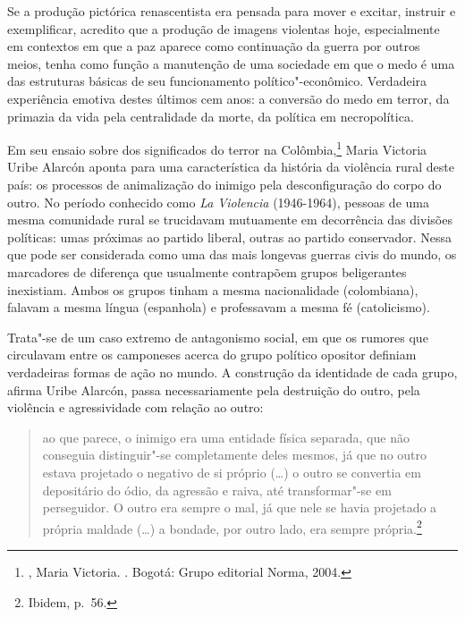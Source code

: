 Se a produção pictórica renascentista era pensada para mover e excitar,
instruir e exemplificar, acredito que a produção de imagens violentas
hoje, especialmente em contextos em que a paz aparece como continuação
da guerra por outros meios, tenha como função a
manutenção de uma sociedade em que o medo é uma das estruturas básicas
de seu funcionamento político"-econômico. Verdadeira experiência emotiva
destes últimos cem anos: a conversão do medo em terror, da primazia da
vida pela centralidade da morte, da política em necropolítica.

\asterisc

Em seu ensaio sobre dos significados do terror na Colômbia,\footnote{, Maria Victoria. {}. Bogotá: Grupo
  editorial Norma, 2004.} Maria Victoria Uribe Alarcón aponta
para uma característica da história da violência rural deste país: os
processos de animalização do inimigo pela desconfiguração do corpo do outro. No
período conhecido como \emph{La Violencia} (1946-1964), pessoas de uma
mesma comunidade rural se trucidavam mutuamente em decorrência das
divisões políticas: umas próximas ao partido liberal, outras ao partido
conservador. Nessa que pode ser considerada como uma das mais longevas
guerras civis do mundo, os marcadores de diferença que usualmente
contrapõem grupos beligerantes inexistiam. Ambos os grupos tinham a
mesma nacionalidade (colombiana), falavam a mesma língua (espanhola) e
professavam a mesma fé (catolicismo).

Trata"-se de um caso extremo de antagonismo social, em que os rumores que
circulavam entre os camponeses acerca do grupo político opositor definiam verdadeiras formas de ação no mundo. A construção da identidade
de cada grupo, afirma Uribe Alarcón, passa necessariamente pela
destruição do outro, pela violência e agressividade com relação ao
outro:

\begin{quote}
ao que parece, o inimigo era uma entidade física separada, que não
conseguia distinguir"-se completamente deles mesmos, já que no outro
estava projetado o negativo de si próprio (\ldots{}) o outro se convertia em
depositário do ódio, da agressão e raiva, até transformar"-se em
perseguidor. O outro era sempre o mal, já que nele se havia projetado a
própria maldade (\ldots{}) a bondade, por outro lado, era sempre
própria.\footnote{Ibidem, p.~56.}
\end{quote}

